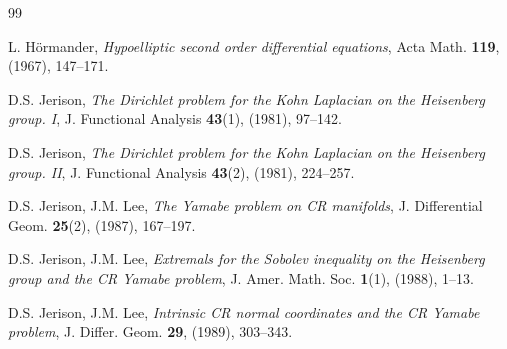 \documentclass[11pt]{amsart}
\numberwithin{equation}{section} %
\theoremstyle{definition}
\begin{document}
\begin{thebibliography}{99}
%	
%	
	
	L. H\"{o}rmander, 
	{\em Hypoelliptic second order differential equations}, 
	Acta Math. {\bf 119}, (1967), 147--171.
	
	D.S. Jerison, 
	{\em The Dirichlet problem for the Kohn Laplacian on the Heisenberg group. I}, 
	J. Functional Analysis {\bf 43}(1), (1981), 97--142.
	
	D.S. Jerison, 
	{\em The Dirichlet problem for the Kohn Laplacian on the Heisenberg group. II}, 
	J. Functional Analysis {\bf 43}(2), (1981), 224--257.
	
	
	D.S. Jerison, J.M. Lee, 
	{\em The Yamabe problem on CR manifolds}, 
	J. Differential Geom. {\bf 25}(2), (1987), 167--197.
	
	D.S. Jerison, J.M. Lee, 
	{\em Extremals for the Sobolev inequality on the Heisenberg group and the CR Yamabe problem}, 
	J. Amer. Math. Soc. {\bf 1}(1), (1988), 1--13.

D.S. Jerison, J.M. Lee, 
{\em Intrinsic CR normal coordinates and the CR Yamabe problem},
J. Differ. Geom. {\bf 29}, (1989), 303--343.
%	
	
	
	

	
%	
% 
	

\end{thebibliography}
\end{document}
